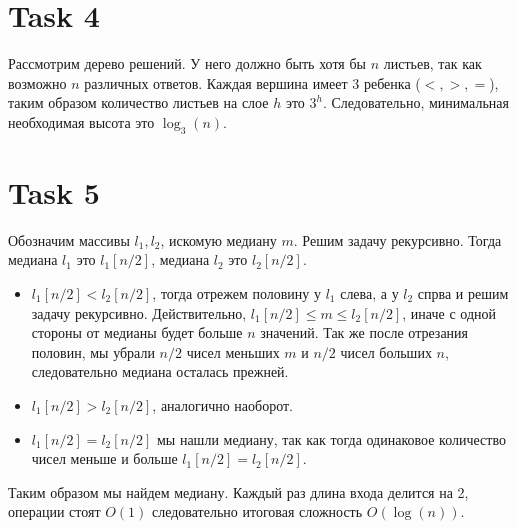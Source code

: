 \documentclass[12pt]{exam}
\begin{document}
\section*{Task 4}
Рассмотрим дерево решений. 
У него должно быть хотя бы $n$ листьев, так как возможно $n$ различных ответов. 
Каждая вершина имеет 3 ребенка ($<, >, =$), таким образом количество листьев на слое $h$ это $3^h$.
Следовательно, минимальная необходимая высота это $\log_3(n)$.

\section*{Task 5}
Обозначим массивы $l_1, l_2$, искомую медиану $m$. 
Решим задачу рекурсивно.
Тогда медиана $l_1$ это $l_1[n / 2]$, медиана $l_2$ это $l_2[n / 2]$. 
\begin{itemize}
    \item $l_1[n / 2] < l_2[n / 2]$, тогда отрежем половину у $l_1$ слева, а у $l_2$ спрва и решим задачу рекурсивно.
    Действительно, $l_1[n / 2] \leq m \leq l_2[n / 2]$, иначе с одной стороны от медианы будет больше $n$ значений.
    Так же после отрезания половин, мы убрали $n / 2$ чисел меньших $m$ и $n / 2$ чисел больших $n$, следовательно медиана осталась прежней.
    \item $l_1[n / 2] > l_2[n / 2]$, аналогично наоборот.
    \item $l_1[n / 2] = l_2[n / 2]$ мы нашли медиану, так как тогда одинаковое количество чисел меньше и больше $l_1[n / 2] = l_2[n / 2]$.
\end{itemize}
Таким образом мы найдем медиану. 
Каждый раз длина входа делится на 2, операции стоят $O(1)$ следовательно итоговая сложность $O(\log(n))$.
\end{document}
